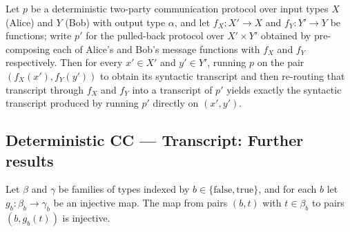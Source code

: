 \begin{theorem}
\label{CommunicationComplexity.Deterministic.Protocol.transcriptComap_transcript}
\leanok
{}
Let $p$ be a deterministic two-party communication protocol over input types $X$ (Alice)
and $Y$ (Bob) with output type $\alpha$, and let $f_X : X' \to X$ and $f_Y : Y' \to Y$
be functions; write $p'$ for the pulled-back protocol over $X' \times Y'$ obtained by
pre-composing each of Alice's and Bob's message functions with $f_X$ and $f_Y$
respectively. Then for every $x' \in X'$ and $y' \in Y'$, running $p$ on the pair
$(f_X(x'), f_Y(y'))$ to obtain its syntactic transcript and then re-routing that
transcript through $f_X$ and $f_Y$ into a transcript of $p'$ yields exactly the
syntactic transcript produced by running $p'$ directly on $(x', y')$.
\end{theorem}

\subsection*{Deterministic CC --- Transcript: Further results}

\begin{theorem}
\label{CommunicationComplexity.Deterministic.Protocol.sigma_map_bool_injective}
\leanok
{}
Let $\beta$ and $\gamma$ be families of types indexed by
$b\in\{\mathrm{false},\mathrm{true}\}$, and for each $b$ let $g_b:\beta_b\to\gamma_b$ be
an injective map. The map from pairs $(b,t)$ with $t\in\beta_b$ to pairs $(b,g_b(t))$ is
injective.
\end{theorem}
